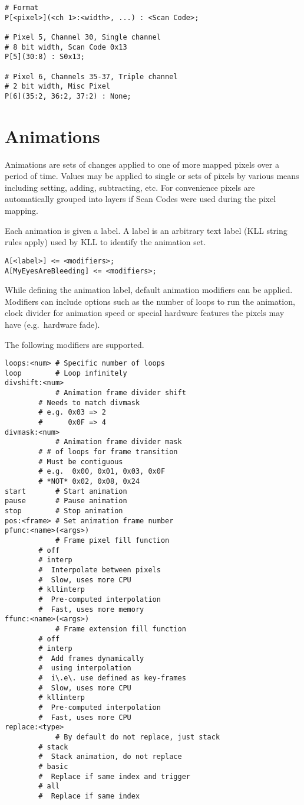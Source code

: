 \documentclass{kiibohd-template}
\begin{document}
\begin{lstlisting}
# Format
P[<pixel>](<ch 1>:<width>, ...) : <Scan Code>;

# Pixel 5, Channel 30, Single channel
# 8 bit width, Scan Code 0x13
P[5](30:8) : S0x13;

# Pixel 6, Channels 35-37, Triple channel
# 2 bit width, Misc Pixel
P[6](35:2, 36:2, 37:2) : None;
\end{lstlisting}


\section{Animations}
\label{sec:animations}

Animations are sets of changes applied to one of more mapped pixels over a period of time.
Values may be applied to single or sets of pixels by various means including setting, adding, subtracting, etc.
For convenience pixels are automatically grouped into layers if Scan Codes were used during the pixel mapping.

Each animation is given a label.
A label is an arbitrary text label (KLL string rules apply) used by KLL to identify the animation set.

\begin{lstlisting}
A[<label>] <= <modifiers>;
A[MyEyesAreBleeding] <= <modifiers>;
\end{lstlisting}

While defining the animation label, default animation modifiers can be applied.
Modifiers can include options such as the number of loops to run the animation, clock divider for animation speed or special hardware features the pixels may have (e.g.\ hardware fade).

The following modifiers are supported.

\begin{lstlisting}
loops:<num> # Specific number of loops
loop        # Loop infinitely
divshift:<num>
            # Animation frame divider shift
	    # Needs to match divmask
	    # e.g. 0x03 => 2
	    #      0x0F => 4
divmask:<num>
            # Animation frame divider mask
	    # # of loops for frame transition
	    # Must be contiguous
	    # e.g.  0x00, 0x01, 0x03, 0x0F
	    # *NOT* 0x02, 0x08, 0x24
start       # Start animation
pause       # Pause animation
stop        # Stop animation
pos:<frame> # Set animation frame number
pfunc:<name>(<args>)
            # Frame pixel fill function
	    # off
	    # interp
	    #  Interpolate between pixels
	    #  Slow, uses more CPU
	    # kllinterp
	    #  Pre-computed interpolation
	    #  Fast, uses more memory
ffunc:<name>(<args>)
            # Frame extension fill function
	    # off
	    # interp
	    #  Add frames dynamically
	    #  using interpolation
	    #  i\.e\. use defined as key-frames
	    #  Slow, uses more CPU
	    # kllinterp
	    #  Pre-computed interpolation
	    #  Fast, uses more CPU
replace:<type>
            # By default do not replace, just stack
	    # stack
	    #  Stack animation, do not replace
	    # basic
	    #  Replace if same index and trigger
	    # all
	    #  Replace if same index
\end{lstlisting}
\end{document}
